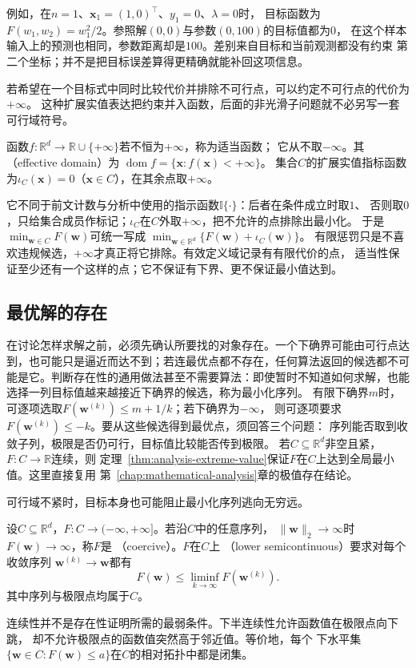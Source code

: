 例如，在$n=1$、$\bm{x}_1=(1,0)^\top$、$y_1=0$、$\lambda=0$时，
目标函数为$F(w_1,w_2)=w_1^2/2$。参照解$(0,0)$与参数$(0,100)$的目标值都为$0$，
在这个样本输入上的预测也相同，参数距离却是$100$。差别来自目标和当前观测都没有约束
第二个坐标；并不是把目标误差算得更精确就能补回这项信息。

若希望在一个目标式中同时比较代价并排除不可行点，可以约定不可行点的代价为$+\infty$。
这种扩展实值表达把约束并入函数，后面的非光滑子问题就不必另写一套可行域符号。
\begin{definition}
\label{def:opt-proper-domain-indicator}
函数$f:\mathbb R^d\to\mathbb R\cup\{+\infty\}$若不恒为$+\infty$，称为适当函数；
它从不取$-\infty$。其（effective domain）为
$\operatorname{dom}f=\{\bm x:f(\bm x)<+\infty\}$。
集合$C$的扩展实值指标函数为$\iota_C(\bm x)=0$（$\bm x\in C$），在其余点取$+\infty$。
\end{definition}
它不同于前文计数与分析中使用的指示函数$\mathbb I\{\cdot\}$：后者在条件成立时取$1$、
否则取$0$，只给集合成员作标记；$\iota_C$在$C$外取$+\infty$，把不允许的点排除出最小化。
于是$\min_{\bm w\in C}F(\bm w)$可统一写成
$\min_{\bm w\in\mathbb R^d}\{F(\bm w)+\iota_C(\bm w)\}$。
有限惩罚只是不喜欢违规候选，$+\infty$才真正将它排除。有效定义域记录有有限代价的点，
适当性保证至少还有一个这样的点；它不保证有下界、更不保证最小值达到。

\subsection{最优解的存在}
\label{sec:opt-existence}

在讨论怎样求解之前，必须先确认所要找的对象存在。一个下确界可能由可行点达到，也可能只是逼近而达不到；若连最优点都不存在，任何算法返回的候选都不可能是它。判断存在性的通用做法甚至不需要算法：即使暂时不知道如何求解，也能选择一列目标值越来越接近下确界的候选，称为最小化序列。
有限下确界$m$时，可逐项选取$F(\bm w^{(k)})\leq m+1/k$；若下确界为$-\infty$，
则可逐项要求$F(\bm w^{(k)})\leq-k$。要从这些候选得到最优点，须回答三个问题：
序列能否取到收敛子列，极限是否仍可行，目标值比较能否传到极限。
若$C\subseteq\mathbb{R}^d$非空且紧，$F:C\to\mathbb{R}$连续，则
定理~\ref{thm:analysis-extreme-value}保证$F$在$C$上达到全局最小值。这里直接复用
第~\ref{chap:mathematical-analysis}章的极值存在结论。

可行域不紧时，目标本身也可能阻止最小化序列逃向无穷远。
\begin{definition}[强制性与下半连续性]
\label{def:opt-coercive-lower-semicontinuous}
设$C\subseteq\mathbb R^d$，$F:C\to(-\infty,+\infty]$。若沿$C$中的任意序列，
$\lVert\bm{w}\rVert_2\to\infty$时$F(\bm{w})\to\infty$，称$F$是
（coercive）。$F$在$C$上
（lower semicontinuous）要求对每个收敛序列
$\bm{w}^{(k)}\to\bm{w}$都有
\[
  F(\bm{w})\leq\liminf_{k\to\infty}F(\bm{w}^{(k)}).
\]
其中序列与极限点均属于$C$。
\end{definition}
连续性并不是存在性证明所需的最弱条件。下半连续性允许函数值在极限点向下跳，
却不允许极限点的函数值突然高于邻近值。等价地，每个
下水平集$\{\bm{w}\in C:F(\bm{w})\leq a\}$在$C$的相对拓扑中都是闭集。

